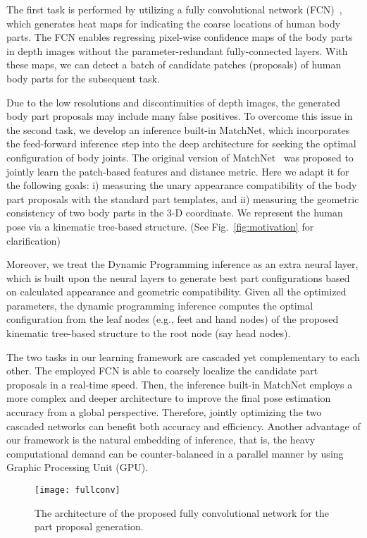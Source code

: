 \documentclass{sig-alternate-05-2015}
\begin{document}
The first task is performed by utilizing a fully convolutional network (FCN)~\cite{fullconv}, which generates heat maps for indicating the coarse locations of human body parts. The FCN enables regressing pixel-wise confidence maps of the body parts in depth images without the parameter-redundant fully-connected layers. With these maps, we can detect a batch of candidate patches (proposals) of human body parts for the subsequent task. 

Due to the low resolutions and discontinuities of depth images, the generated body part proposals may include many false positives. To overcome this issue in the second task, we develop an inference built-in MatchNet, which incorporates the feed-forward inference step into the deep architecture for seeking the optimal configuration of body joints. The original version of MatchNet~\cite{mn15cvpr} was proposed to jointly learn the patch-based features and distance metric. Here we adapt it for the following goals: i) measuring the unary appearance compatibility of the body part proposals with the standard part templates, and ii) measuring the geometric consistency of two body parts in the 3-D coordinate. We represent the human pose via a kinematic tree-based structure. (See Fig.~\ref{fig:motivation} for clarification)

Moreover, we treat the Dynamic Programming inference as an extra neural layer, which is built upon the neural layers to generate best part configurations based on calculated appearance and geometric compatibility. Given all the optimized parameters, the dynamic programming inference computes the optimal configuration from the leaf nodes (e.g., feet and hand nodes) of the proposed kinematic tree-based structure to the root node (say head nodes).


The two tasks in our learning framework are cascaded yet complementary to each other. The employed FCN is able to coarsely localize the candidate part proposals in a real-time speed. Then, the inference built-in MatchNet employs a more complex and deeper architecture to improve the final pose estimation accuracy from a global perspective. Therefore, jointly optimizing the two cascaded networks can benefit both accuracy and efficiency. Another advantage of our framework is the natural embedding of inference, that is, the heavy computational demand can be counter-balanced in a parallel manner by using Graphic Processing Unit (GPU).

\begin{figure*}[!htb]
\centering
\texttt{[image: fullconv]}
\caption{The architecture of the proposed fully convolutional network for the part proposal generation.}\label{fig:fullconv}
\end{figure*}
\end{document}
